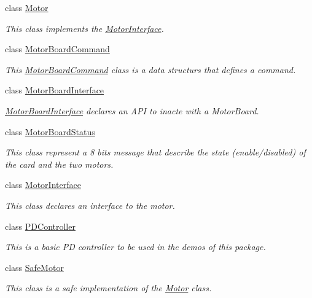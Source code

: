 \begin{DoxyCompactItemize}
class \hyperlink{classblmc__drivers_1_1Motor}{Motor}
\begin{DoxyCompactList}\small\item\em This class implements the \hyperlink{classblmc__drivers_1_1MotorInterface}{Motor\+Interface}. \end{DoxyCompactList}\item 
class \hyperlink{classblmc__drivers_1_1MotorBoardCommand}{Motor\+Board\+Command}
\begin{DoxyCompactList}\small\item\em This \hyperlink{classblmc__drivers_1_1MotorBoardCommand}{Motor\+Board\+Command} class is a data structurs that defines a command. \end{DoxyCompactList}\item 
class \hyperlink{classblmc__drivers_1_1MotorBoardInterface}{Motor\+Board\+Interface}
\begin{DoxyCompactList}\small\item\em \hyperlink{classblmc__drivers_1_1MotorBoardInterface}{Motor\+Board\+Interface} declares an A\+PI to inacte with a Motor\+Board. \end{DoxyCompactList}\item 
class \hyperlink{classblmc__drivers_1_1MotorBoardStatus}{Motor\+Board\+Status}
\begin{DoxyCompactList}\small\item\em This class represent a 8 bits message that describe the state (enable/disabled) of the card and the two motors. \end{DoxyCompactList}\item 
class \hyperlink{classblmc__drivers_1_1MotorInterface}{Motor\+Interface}
\begin{DoxyCompactList}\small\item\em This class declares an interface to the motor. \end{DoxyCompactList}\item 
class \hyperlink{classblmc__drivers_1_1PDController}{P\+D\+Controller}
\begin{DoxyCompactList}\small\item\em This is a basic PD controller to be used in the demos of this package. \end{DoxyCompactList}\item 
class \hyperlink{classblmc__drivers_1_1SafeMotor}{Safe\+Motor}
\begin{DoxyCompactList}\small\item\em This class is a safe implementation of the \hyperlink{classblmc__drivers_1_1Motor}{Motor} class. \end{DoxyCompactList}\item 

\end{DoxyCompactItemize}

